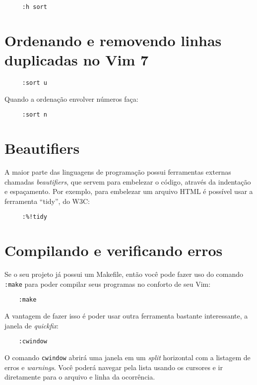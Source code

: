 \begin{verbatim}
     :h sort
\end{verbatim}

\section{Ordenando e removendo linhas duplicadas no Vim 7}

\begin{verbatim}
     :sort u
\end{verbatim}

Quando a ordenação envolver números faça:

\begin{verbatim}
     :sort n
\end{verbatim}

\section{Beautifiers}

A maior parte das linguagens de programação possui ferramentas
externas chamadas {\em beautifiers}, que servem para embelezar o código,
através da indentação e espaçamento. Por exemplo, para embelezar um
arquivo HTML é possível usar a ferramenta ``tidy'', do W3C:

\begin{verbatim}
     :%!tidy
\end{verbatim}

\section{Compilando e verificando erros}
Se o seu projeto já possui um Makefile, então você pode fazer uso do comando
{\tt :make} para poder compilar seus programas no conforto de seu Vim:

\begin{verbatim}
 	:make
\end{verbatim}

A vantagem de fazer isso é poder usar outra ferramenta bastante interessante, a janela
de {\em quickfix}:

\begin{verbatim}
 	:cwindow
\end{verbatim}

O comando {\tt cwindow} abrirá uma janela em um {\em split} horizontal com a
listagem de erros e {\em warnings}.  Você poderá navegar pela lista usando os
cursores e ir diretamente para o arquivo e linha da ocorrência.

